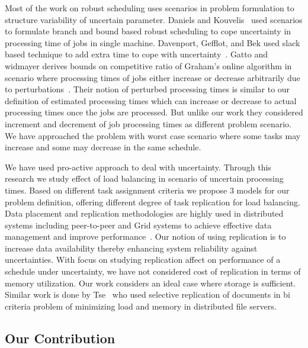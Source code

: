 \documentclass[10pt, conference, compsocconf]{IEEEtran}
\begin{document}
 Most of the work on robust scheduling uses scenarios in problem formulation to structure variability of uncertain parameter. Daniels and Kouvelis~\cite{citeulike:8334169} used scenarios to formulate branch and bound based robust scheduling to cope uncertainty in processing time of jobs in single machine. Davenport, Gefflot, and Bek used slack based technique to add extra time to cope with uncertainty~\cite{Davenport_slack-basedtechniques}. Gatto and widmayer derives bounds on competitive ratio of Graham’s online algorithm in scenario where processing times of jobs either increase or decrease arbitrarily due to perturbations~\cite{Gatto07}.  Their notion of perturbed processing times is similar to our definition of estimated processing times which can increase or decrease to actual processing times once the jobs are processed. But unlike our work they considered increment and decrement of job processing times as different problem scenario. We have approached the problem with worst case scenario where some tasks may increase and some may decrease in the same schedule.
  
 We have used pro-active approach to deal with uncertainty. Through this research we study effect of load balancing in scenario of uncertain processing times. Based on different task assignment criteria we  propose 3 models for our problem definition, offering different degree of task replication for load balancing. Data placement and replication  methodologies are highly used in distributed systems including peer-to-peer and Grid systems to achieve effective data management and improve performance~\cite{Cirne2007213}\cite{Abawajy}\cite{4215379}. Our notion of using replication is to increase data availability thereby enhancing system reliability against uncertainties. With focus on studying replication affect on  performance of a schedule under uncertainty, we have not considered cost of replication in terms of memory utilization. Our work considers an ideal case where storage is sufficient.  Similar work is done by Tse~\cite{DBLP:journals/tc/Tse12} who used selective replication of documents in bi criteria problem of minimizing load and memory in distributed file servers.



\subsection{Our Contribution}
\end{document}
